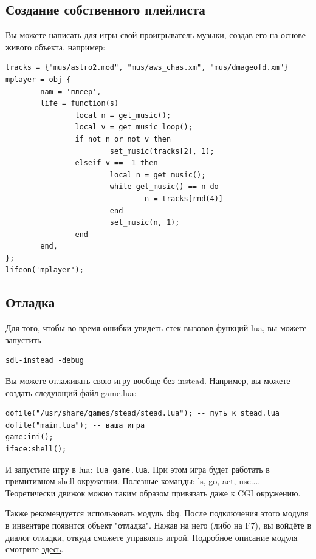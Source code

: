 \documentclass[12pt]{article}
\begin{document}
\subsection{Создание собственного плейлиста}
Вы можете написать для игры свой проигрыватель музыки, создав его на основе живого объекта, например:

\begin{verbatim}
tracks = {"mus/astro2.mod", "mus/aws_chas.xm", "mus/dmageofd.xm"}
mplayer = obj {
        nam = 'плеер',
        life = function(s)
                local n = get_music();
                local v = get_music_loop();
                if not n or not v then
                        set_music(tracks[2], 1);
                elseif v == -1 then
                        local n = get_music();
                        while get_music() == n do
                                n = tracks[rnd(4)]
                        end
                        set_music(n, 1);
                end
        end,
};
lifeon('mplayer');
\end{verbatim}

\subsection{Отладка}
Для того, чтобы во время ошибки увидеть стек вызовов функций lua, вы можете запустить

\begin{verbatim}
sdl-instead -debug
\end{verbatim}

Вы можете отлаживать свою игру вообще без instead. Например, вы можете создать следующий файл game.lua:

\begin{verbatim}
dofile("/usr/share/games/stead/stead.lua"); -- путь к stead.lua
dofile("main.lua"); -- ваша игра
game:ini();
iface:shell();
\end{verbatim}

И запустите игру в lua: \verb/lua game.lua/. При этом игра будет работать в примитивном shell окружении. Полезные команды: ls, go, act, use.... Теоретически движок можно таким образом привязать даже к CGI окружению.

Также рекомендуется использовать модуль \verb/dbg/. После подключения этого модуля в инвентаре появится объект "отладка". Нажав на него (либо на F7), вы войдёте в диалог отладки, откуда сможете управлять игрой. Подробное описание модуля смотрите \href{http://instead.pinebrush.com/wiki/ru/gamedev/modules/dbg}{здесь}.
\end{document}

